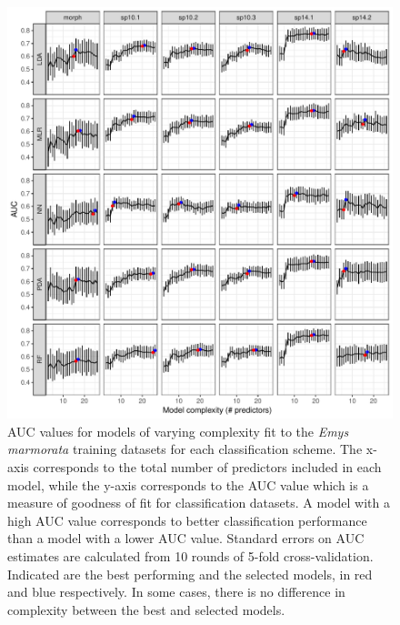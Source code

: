 \documentclass[10pt,letterpaper]{article}
\begin{document}
\afterpage{\clearpage}
\begin{figure}[ht]
  \centering
  \includegraphics[height = \textheight, width = \textwidth, keepaspectratio = true]{figure/emys_model_sel}
  \caption{AUC values for models of varying complexity fit to the \textit{Emys marmorata} training datasets for each classification scheme. The x-axis corresponds to the total number of predictors included in each model, while the y-axis corresponds to the AUC value which is a measure of goodness of fit for classification datasets. A model with a high AUC value corresponds to better classification performance than a model with a lower AUC value. Standard errors on AUC estimates are calculated from 10 rounds of 5-fold cross-validation. Indicated are the best performing and the selected models, in red and blue respectively. In some cases, there is no difference in complexity between the best and selected models.}
  \label{fig:emys_sel}
\end{figure}
\end{document}

